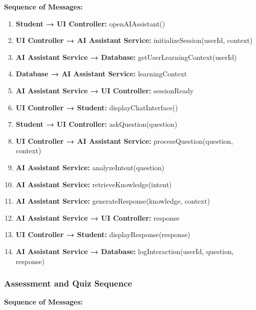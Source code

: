 \textbf{Sequence of Messages:}

\begin{enumerate}
    \item \textbf{Student → UI Controller:} openAIAssistant()
    \item \textbf{UI Controller → AI Assistant Service:} initializeSession(userId, context)
    \item \textbf{AI Assistant Service → Database:} getUserLearningContext(userId)
    \item \textbf{Database → AI Assistant Service:} learningContext
    \item \textbf{AI Assistant Service → UI Controller:} sessionReady
    \item \textbf{UI Controller → Student:} displayChatInterface()
    \item \textbf{Student → UI Controller:} askQuestion(question)
    \item \textbf{UI Controller → AI Assistant Service:} processQuestion(question, context)
    \item \textbf{AI Assistant Service:} analyzeIntent(question)
    \item \textbf{AI Assistant Service:} retrieveKnowledge(intent)
    \item \textbf{AI Assistant Service:} generateResponse(knowledge, context)
    \item \textbf{AI Assistant Service → UI Controller:} response
    \item \textbf{UI Controller → Student:} displayResponse(response)
    \item \textbf{AI Assistant Service → Database:} logInteraction(userId, question, response)
\end{enumerate}

\subsubsection{Assessment and Quiz Sequence}

\textbf{Sequence of Messages:}

